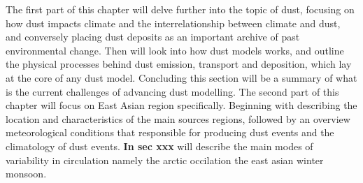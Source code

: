 

The first part of this chapter will delve further into the topic of dust, focusing on how dust impacts climate and the interrelationship between climate and dust, and conversely placing dust deposits as an important archive of past environmental change. Then  will look into how dust models works, and outline the physical processes behind dust emission, transport and deposition, which lay at the core of any dust model. Concluding this section will be a summary of what is the current challenges of advancing dust modelling. The second part of this chapter will focus on East Asian region specifically. Beginning with describing the location and characteristics of the main sources regions, followed by an overview meteorological conditions that responsible for producing dust events and the climatology of dust events. \textbf{In sec xxx} will describe the main modes of variability in circulation namely the arctic occilation the east asian winter monsoon. 

